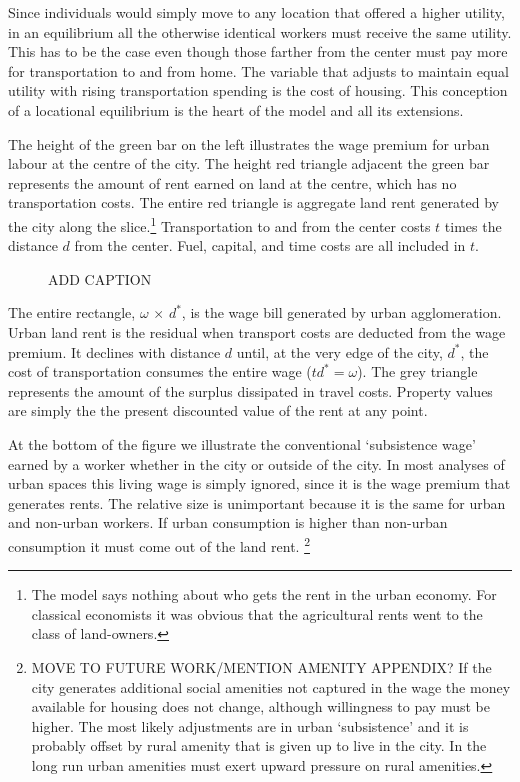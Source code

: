  Since individuals would simply move to any location that offered a higher utility, in an equilibrium all the otherwise identical workers must receive the same utility. This has to be the case even though those farther from the center must pay more for transportation to and from home. The variable that  adjusts to maintain equal utility with rising transportation spending is the cost of housing. This conception of a \gls{locational equilibrium} is the heart of the model and all its extensions.

The height of the green bar on the left illustrates the wage premium for urban labour at the centre of the  city. 
The height red triangle adjacent the green bar represents the amount of rent earned on land at the centre, which has no transportation costs. The entire red triangle is aggregate land rent generated by the city along the slice.\footnote{The model says nothing about who gets the rent in the urban economy. For classical economists it was obvious that the agricultural rents went to the class of land-owners.} Transportation to and from the center costs $t$ times the distance $d$ from the center. Fuel, capital, and time costs are  all included in $t$. 

\begin{figure}
    \begin{center}
    
    \caption{ADD CAPTION}
    \label{fig-alonzo-simple}
    \end{center}
\end{figure}

The entire rectangle, $\omega$ $\times$ $d^*$, is the wage bill generated by urban agglomeration. Urban land rent is the residual when transport costs are deducted from the wage premium. It declines  with distance $d$ until, at the very edge of the city, $d^*$, the cost of transportation  consumes the entire wage ($td^*=\omega$). The grey triangle represents the amount of the surplus dissipated in travel costs.  Property values are simply the the present discounted value of the rent at any point.

At the bottom of the figure we illustrate the conventional `subsistence wage'  earned by a worker whether in the city or outside of the city. In most analyses of urban spaces this living wage is simply ignored, since it is the wage premium that generates rents.  The relative size is unimportant because it is the same for urban and non-urban workers. If urban consumption is higher than non-urban consumption it must come out of the land rent.
\footnote{MOVE TO FUTURE WORK/MENTION AMENITY APPENDIX? If the city generates additional social amenities not captured in the wage  the money available for housing does not change, although willingness to pay must be higher. The most likely adjustments are in urban `subsistence' and it is probably offset by rural amenity that is given up to live in the city. In the long run urban amenities must exert upward pressure on rural amenities.} %

